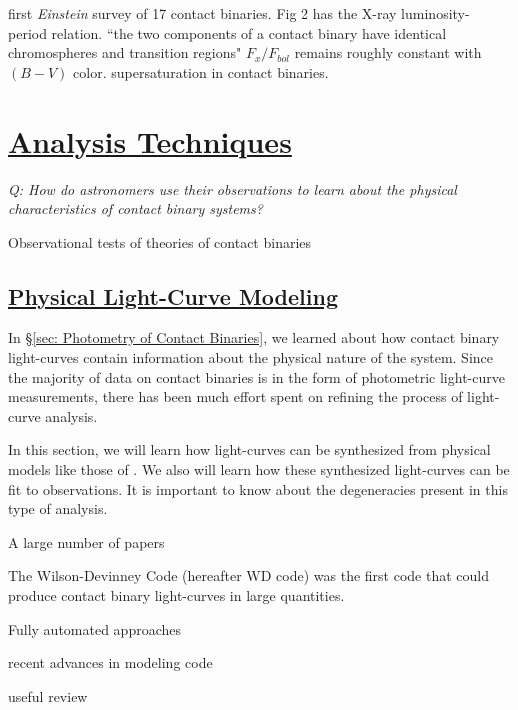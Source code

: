 \documentclass[12pt]{article} %
\numberwithin{equation}{section} %
\begin{document}
\citep{cruddace1984contact} first \emph{Einstein} survey of 17 contact binaries. Fig 2 has the X-ray luminosity- period relation.
\citep{vilhu1987chromospheric} ``the two components of a contact binary have identical chromospheres and transition regions" $F_{x} / F_{bol}$ remains roughly constant with $(B - V)$ color.
\citep{stepien2001rosat} supersaturation in contact binaries.

\section[Analysis Techniques]{\hyperlink{toc}{Analysis Techniques}} \label{sec: analysis_techniques}

\emph{Q: How do astronomers use their observations to learn about the physical characteristics of contact binary systems?}

Observational tests of theories of contact binaries \citet{lucy1979observational}

\subsection[Physical Light-Curve Modeling]{\hyperlink{toc}{Physical Light-Curve Modeling}} \label{sec: Physical Light-Curve Modeling}

In \S\ref{sec: Photometry of Contact Binaries}, we learned about how contact binary light-curves contain information about the physical nature of the system. Since the majority of data on contact binaries is in the form of photometric light-curve measurements, there has been much effort spent on refining the process of light-curve analysis.

In this section, we will learn how light-curves can be synthesized from physical models like those of \citet{lucy1968contact}. We also will learn how these synthesized light-curves can be fit to observations. It is important to know about the degeneracies present in this type of analysis. 

A large number of papers 

The Wilson-Devinney Code (hereafter WD code)  was the first code that could produce contact binary light-curves in large quantities. 

Fully automated approaches \citep{prsa2009fully} \citep{prsa2008artificial}

recent advances in modeling code \citep{prvsa2013physics}

useful review \citep{gimenez2006close}
\end{document}
